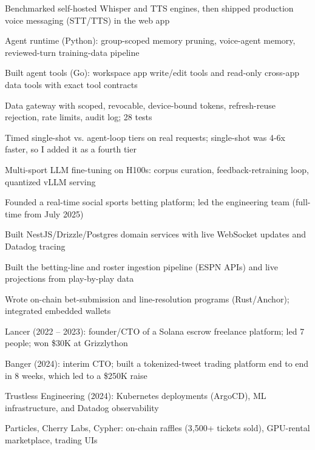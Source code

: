 \documentclass[print]{jack-resume}
\begin{document}
\begin{tightemize}
    \item Benchmarked self-hosted Whisper and TTS engines, then shipped production voice messaging (STT/TTS) in the web app
    \item Agent runtime (Python): group-scoped memory pruning, voice-agent memory, reviewed-turn training-data pipeline
    \item Built agent tools (Go): workspace app write/edit tools and read-only cross-app data tools with exact tool contracts
    \item Data gateway with scoped, revocable, device-bound tokens, refresh-reuse rejection, rate limits, audit log; 28 tests
    \item Timed single-shot vs. agent-loop tiers on real requests; single-shot was 4-6x faster, so I added it as a fourth tier
    \item Multi-sport LLM fine-tuning on H100s: corpus curation, feedback-retraining loop, quantized vLLM serving
\end{tightemize}
\sectionsep

\begin{tightemize}
    \item Founded a real-time social sports betting platform; led the engineering team (full-time from July 2025)
    \item Built NestJS/Drizzle/Postgres domain services with live WebSocket updates and Datadog tracing
    \item Built the betting-line and roster ingestion pipeline (ESPN APIs) and live projections from play-by-play data
    \item Wrote on-chain bet-submission and line-resolution programs (Rust/Anchor); integrated embedded wallets
\end{tightemize}
\sectionsep

\begin{tightemize}
    \item Lancer (2022 – 2023): founder/CTO of a Solana escrow freelance platform; led 7 people; won \$30K at Grizzlython
    \item Banger (2024): interim CTO; built a tokenized-tweet trading platform end to end in 8 weeks, which led to a \$250K raise
    \item Trustless Engineering (2024): Kubernetes deployments (ArgoCD), ML infrastructure, and Datadog observability
    \item Particles, Cherry Labs, Cypher: on-chain raffles (3,500+ tickets sold), GPU-rental marketplace, trading UIs
\end{tightemize}
\sectionsep
\end{document}
